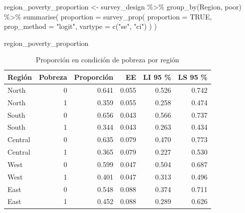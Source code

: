 \documentclass[
  spanish,
  11pt,
  letterpaper,
  oneside,
  open=any]{scrbook}
\newenvironment{Shaded}{\begin{snugshade}}{\end{snugshade}}
\newcommand{\AttributeTok}[1]{\textcolor[rgb]{0.40,0.45,0.13}{#1}}
\newcommand{\ConstantTok}[1]{\textcolor[rgb]{0.56,0.35,0.01}{#1}}
\newcommand{\FunctionTok}[1]{\textcolor[rgb]{0.28,0.35,0.67}{#1}}
\newcommand{\NormalTok}[1]{\textcolor[rgb]{0.00,0.23,0.31}{#1}}
\newcommand{\OtherTok}[1]{\textcolor[rgb]{0.00,0.23,0.31}{#1}}
\newcommand{\SpecialCharTok}[1]{\textcolor[rgb]{0.37,0.37,0.37}{#1}}
\newcommand{\StringTok}[1]{\textcolor[rgb]{0.13,0.47,0.30}{#1}}
\begin{document}
\begin{Shaded}
\begin{Highlighting}[]
\NormalTok{region\_poverty\_proportion }\OtherTok{\textless{}{-}}\NormalTok{ survey\_design }\SpecialCharTok{\%\textgreater{}\%}
  \FunctionTok{group\_by}\NormalTok{(Region, poor) }\SpecialCharTok{\%\textgreater{}\%}
  \FunctionTok{summarise}\NormalTok{(}
    \AttributeTok{proportion =} \FunctionTok{survey\_prop}\NormalTok{(}
      \AttributeTok{proportion =} \ConstantTok{TRUE}\NormalTok{,}
      \AttributeTok{prop\_method =} \StringTok{"logit"}\NormalTok{,}
      \AttributeTok{vartype =} \FunctionTok{c}\NormalTok{(}\StringTok{"se"}\NormalTok{, }\StringTok{"ci"}\NormalTok{)}
\NormalTok{    )}
\NormalTok{  )}

\NormalTok{region\_poverty\_proportion}
\end{Highlighting}
\end{Shaded}

{

\begin{longtable}[]{@{}lrrrrr@{}}

\caption{\label{tbl-svyby-region-pobreza}Proporción en condición de
pobreza por región}

\tabularnewline

\toprule\noalign{}
Región & Pobreza & Proporción & EE & LI 95 \% & LS 95 \% \\
\midrule\noalign{}
\endhead
\bottomrule\noalign{}
\endlastfoot
North & 0 & 0.641 & 0.055 & 0.526 & 0.742 \\
North & 1 & 0.359 & 0.055 & 0.258 & 0.474 \\
South & 0 & 0.656 & 0.043 & 0.566 & 0.737 \\
South & 1 & 0.344 & 0.043 & 0.263 & 0.434 \\
Central & 0 & 0.635 & 0.079 & 0.470 & 0.773 \\
Central & 1 & 0.365 & 0.079 & 0.227 & 0.530 \\
West & 0 & 0.599 & 0.047 & 0.504 & 0.687 \\
West & 1 & 0.401 & 0.047 & 0.313 & 0.496 \\
East & 0 & 0.548 & 0.088 & 0.374 & 0.711 \\
East & 1 & 0.452 & 0.088 & 0.289 & 0.626 \\

\end{longtable}

}
\end{document}
